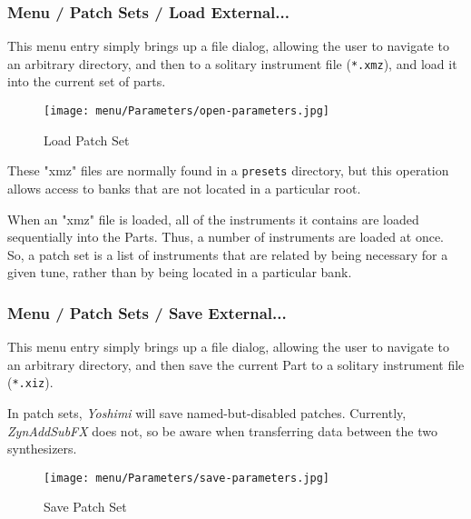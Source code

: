 \subsubsection{Menu / Patch Sets / Load External...}
\label{subsubsec:menu_patch_sets_load}

   This menu entry simply brings up a file dialog, allowing the user to
   navigate to an arbitrary directory, and then to a solitary instrument file
   (\texttt{*.xmz}), and load it into the current set of parts.

\begin{figure}[H]
   \centering 
   \texttt{[image: menu/Parameters/open-parameters.jpg]}
   \caption{Load Patch Set}
   \label{fig:yoshimi_menu_open_parameters}
\end{figure}

   These "xmz" files are normally found in a \texttt{presets} directory, but this
   operation allows access to banks that are not located in a particular root.

   When an "xmz" file is loaded, all of the instruments it contains are
   loaded sequentially into the Parts.  Thus, a number of instruments are loaded
   at once.  So, a patch set is a list of instruments that are related by
   being necessary for a given tune, rather than by being located in a
   particular bank.


\subsubsection{Menu / Patch Sets / Save External...}
\label{subsubsec:menu_patch_sets_save}

   This menu entry simply brings up a file dialog, allowing the user to
   navigate to an arbitrary directory, and then save the current Part
   to a solitary instrument file (\texttt{*.xiz}).

   In patch sets, \textsl{Yoshimi} will save named-but-disabled patches.
   Currently, \textsl{ZynAddSubFX} does not, so be aware when transferring
   data between the two synthesizers.

\begin{figure}[H]
   \centering 
   \texttt{[image: menu/Parameters/save-parameters.jpg]}
   \caption{Save Patch Set}
   \label{fig:yoshimi_menu_save_parameters}
\end{figure}

